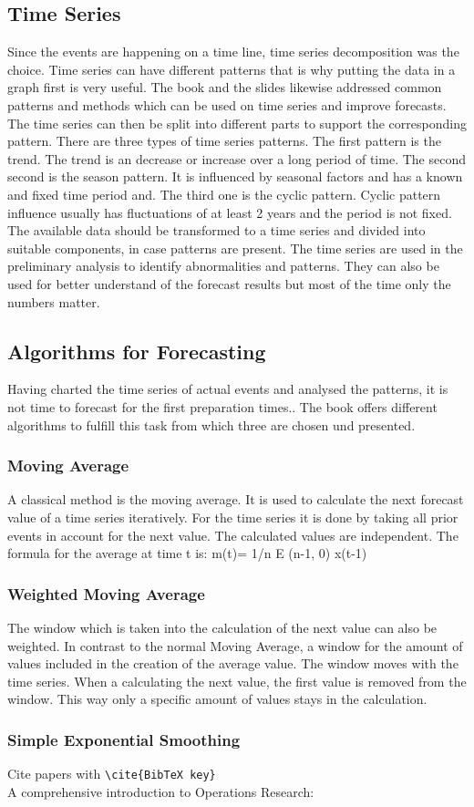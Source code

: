 \subsection{Time Series}\label{subsection:Time Series}
Since the events are happening on a time line, time series decomposition was the choice. Time series can have different patterns that is why putting the data in a graph first is very useful. The book and the slides likewise addressed common patterns and methods which can be used on time series and improve forecasts.
The time series can then be split into different parts to support the corresponding pattern. There are three types of time series patterns. The first pattern is the trend. The trend is an decrease or increase over a long period of time. The second second is the season pattern. It is influenced by seasonal factors and has a known and fixed time period and. The third one is the cyclic pattern. Cyclic pattern influence usually has fluctuations of at least 2 years and the period is not fixed. The available data should be transformed to a time series and divided into suitable components, in case patterns are present.\newline
The time series are used in the preliminary analysis to identify abnormalities and patterns. They can also be used for better understand of the forecast results but most of the time only the numbers matter.
\subsection{Algorithms for Forecasting}\label{subsection:Algorithms for Forecasting}
Having charted the time series of actual events and analysed the patterns, it is not time to forecast for the first preparation times.. The book offers different algorithms to fulfill this task from which three are chosen und presented.
\subsubsection{Moving Average}\label{subsubsection:Moving Average}
A classical method is the moving average. It is used to calculate the next forecast value of a time series iteratively. For the time series it is done by taking all prior events in account for the next value. The calculated values are independent. The formula for the average at time t is: m(t)= 1/n E (n-1, 0) x(t-1)
\subsubsection{Weighted Moving Average}\label{subsubsection:Weighted Moving Average}
The window which is taken into the calculation of the next value can also be weighted. In contrast to the normal Moving Average, a window for the amount of values included in the creation of the average value. The window moves with the time series. When a calculating the next value, the first value is removed from the window. This way only a specific amount of values stays in the calculation.
\subsubsection{Simple Exponential Smoothing}\label{subsubsection:Simple Exponential Smoothing}

Cite papers with \verb+\cite{BibTeX key}+\\
A comprehensive introduction to Operations Research:
